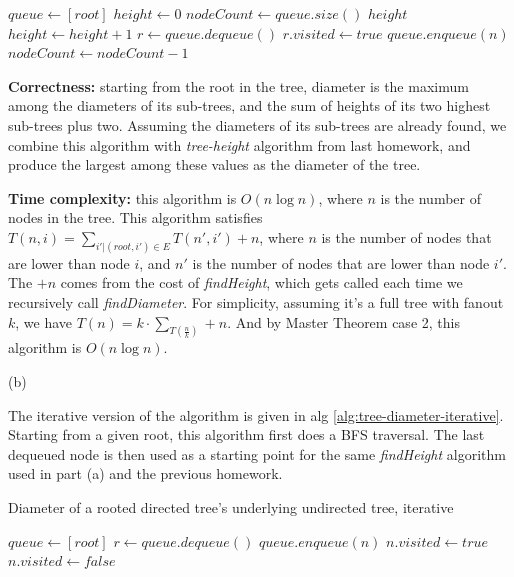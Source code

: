 \documentclass{article}
\begin{document}
\begin{description}
\begin{algorithm}[h]
\begin{algorithmic}[1]
      \State $queue \gets [root]$
      \State $height \gets 0$
        \State $nodeCount \gets queue.size()$
          \State \Return $height$
        \EndIf
        \State $height \gets height + 1$
          \State $r \gets queue.dequeue()$
          \State $r.visited \gets true$
            \State $queue.enqueue(n)$
          \EndFor
          \State $nodeCount \gets nodeCount - 1$
        \EndWhile
      \EndWhile
    \EndFunction
    \end{algorithmic}
  \end{algorithm}

  \textbf{Correctness:} starting from the root in the tree, diameter is the maximum among the diameters of its sub-trees, and the sum of heights of its two highest sub-trees plus two. Assuming the diameters of its sub-trees are already found, we combine this algorithm with \textit{tree-height} algorithm from last homework, and produce the largest among these values as the diameter of the tree.

  \textbf{Time complexity:} this algorithm is $O(n\log{n})$, where $n$ is the number of nodes in the tree. This algorithm satisfies $T(n, i) = \sum_{i' | (root, i') \in E}{T(n', i')} + n$, where $n$ is the number of nodes that are lower than node $i$, and $n'$ is the number of nodes that are lower than node $i'$. The $+n$ comes from the cost of \textit{findHeight}, which gets called each time we recursively call \textit{findDiameter}. For simplicity, assuming it's a full tree with fanout $k$, we have $T(n) = k \cdot \sum_{T(\frac{n}{k})} + n$. And by Master Theorem case 2, this algorithm is $O(n\log{n})$.

  (b)

  The iterative version of the algorithm is given in alg \ref{alg:tree-diameter-iterative}. Starting from a given root, this algorithm first does a BFS traversal. The last dequeued node is then used as a starting point for the same \textit{findHeight} algorithm used in part (a) and the previous homework.

  \begin{algorithm}[h]
  \caption{Diameter of a rooted directed tree's underlying undirected tree, iterative}
  \label{alg:tree-diameter-iterative}
    \begin{algorithmic}[1]
      \State $queue \gets [root]$
        \State $r \gets queue.dequeue()$
          \State $queue.enqueue(n)$
          \State $n.visited \gets true$
        \EndFor
      \EndWhile
        \State $n.visited \gets false$
      \EndFor


\end{algorithmic}
\end{algorithm}
\end{description}
\end{document}
